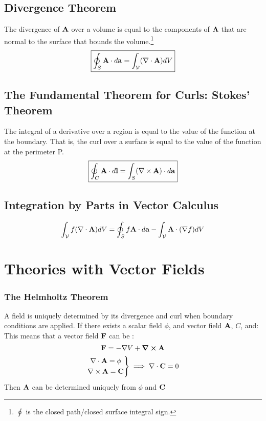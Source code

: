     \subsection*{Divergence Theorem}
        The divergence of \(\vb{A}\) over a volume is equal to the components of \(\vb{A}\) that are normal to the surface that bounds the volume.\footnote{\(\oint\) is the closed path/closed surface integral sign.}
        \begin{align}
            \boxed{\oint_S \vb{A} \da =\int_{\mathcal{V}} (\nabla \cdot \vb{A})dV } 
        \end{align}
    \subsection*{The Fundamental Theorem for Curls: Stokes' Theorem}
        The integral of a derivative over a region is equal to the value of the function at the boundary. That is, the curl over a surface is equal to the value of the function at the perimeter P. 
        \begin{align}
            \boxed{\oint_C \vb{A} \cdot d\vb{l}=\int_{S} (\nabla \times \vb{A}) \cdot d\vb{a}} 
        \end{align}
        \subsection*{Integration by Parts in Vector Calculus}
        \begin{align*}
        \int_{\mathcal{V}} f(\nabla \cdot \vb{A})dV = \oint_S f\vb{A}\da-\int_{\mathcal{V}} \vb{A} \cdot (\nabla f)dV 
        \end{align*}


        \newpage


\section{Theories with Vector Fields \label{vectorfields}}
    \subsubsection*{The Helmholtz Theorem}
        A field is uniquely determined by its divergence and curl when boundary conditions are applied. If there exists a scalar field \(\phi\), and vector field \(\vb{A}\), \(C\), and:
        This means that a vector field \(\vb{F}\) can be :
        \begin{equation}
            \vb{F}=-\nabla V+\curl\vb{A}
        \end{equation}
        \begin{align*}
            \left.
            \begin{gathered}
            \nabla \cdot \vb{A}= \phi
            \\
            \nabla \times \vb{A}= \vb{C}
            \end{gathered}
            \right\}
            \implies
            \nabla \cdot \vb{C} = 0
        \end{align*}
        Then \(\vb{A}\) can be determined uniquely from $\phi$ and $\vb{C}$
